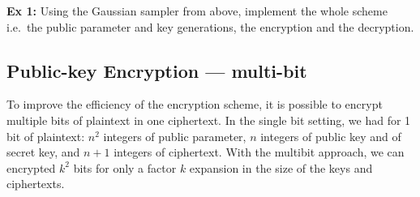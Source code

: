 \documentclass[10pt,a4paper,nobib]{tufte-handout}
\begin{document}
%
%
\textbf{Ex 1:} Using the Gaussian sampler from above, implement the whole scheme i.e.~the public parameter and key generations, the encryption and the decryption.

\subsection{Public-key Encryption --- multi-bit}

To improve the efficiency of the encryption scheme, it is possible to encrypt multiple bits of plaintext in one ciphertext. In the single bit setting, we had for 1 bit of plaintext: $n^2$ integers of public parameter, $n$ integers of public key and of secret key, and $n+1$ integers of ciphertext. With the multibit approach, we can encrypted $k^2$ bits for only a factor $k$ expansion in the size of the keys and ciphertexts.
\end{document}
